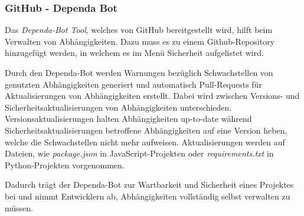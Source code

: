 \subsubsection{GitHub - Dependa Bot} \label{sec:Dependa}
    Das \textit{Dependa-Bot Tool}\textsuperscript{\cite{link:DependaBot}}, welches von GitHub\textsuperscript{\cite{link:GitHub}} bereitgestellt wird, hilft beim Verwalten von Abhängig\-keiten.
    Dazu muss es zu einem Github-Repository hinzugefügt werden, in welchem es im Menü Sicherheit aufgelistet wird. %

    Durch den Dependa-Bot werden Warnungen bezüglich Schwachstellen von genutzten Abhängigkeiten generiert und automatisch Pull-Requests für Aktualisierungen von Abhängigkeiten erstellt.
    Dabei wird zwischen Versions- und Sicherheitsaktualisierungen von Abhängigkeiten unterschieden.
    Versionsaktualisierungen halten Abhängigkeiten up-to-date während Sicherheitsaktualisierungen betroffene Abhängigkeiten auf eine Version heben, welche die Schwachstellen nicht mehr aufweisen.
    Aktualisierungen werden auf Dateien, wie \textit{package.json} in JavaScript-Projekten oder \textit{requirements.txt} in Python-Projekten vorgenommen.

    Dadurch trägt der Dependa-Bot zur Wartbarkeit und Sicherheit eines Projektes bei und nimmt Entwicklern ab, Abhängigkeiten vollständig selbst verwalten zu müssen.